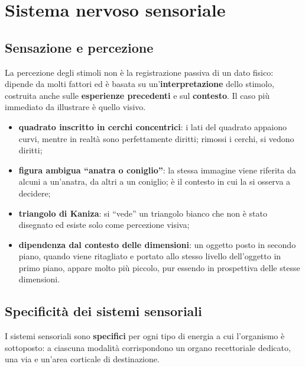 \chapter{Sistema nervoso sensoriale}

\section{Sensazione e percezione}

La percezione degli stimoli non è la registrazione passiva di un dato fisico: dipende da molti
fattori ed è basata su un'\textbf{interpretazione} dello stimolo, costruita anche sulle
\textbf{esperienze precedenti} e sul \textbf{contesto}. Il caso più immediato da illustrare è
quello visivo.

\begin{itemize}
  \item \textbf{quadrato inscritto in cerchi concentrici}: i lati del quadrato appaiono curvi,
    mentre in realtà sono perfettamente diritti; rimossi i cerchi, si vedono diritti;
  \item \textbf{figura ambigua ``anatra o coniglio''}: la stessa immagine viene riferita da alcuni
    a un'anatra, da altri a un coniglio; è il contesto in cui la si osserva a decidere;
  \item \textbf{triangolo di Kaniza}: si ``vede'' un triangolo bianco che non è stato disegnato ed
    esiste solo come percezione visiva;
  \item \textbf{dipendenza dal contesto delle dimensioni}: un oggetto posto in secondo piano,
    quando viene ritagliato e portato allo stesso livello dell'oggetto in primo piano, appare
    molto più piccolo, pur essendo in prospettiva delle stesse dimensioni.
\end{itemize}

\section{Specificità dei sistemi sensoriali}

I sistemi sensoriali sono \textbf{specifici} per ogni tipo di energia a cui l'organismo è
sottoposto: a ciascuna modalità corrispondono un organo recettoriale dedicato, una via e un'area
corticale di destinazione.

